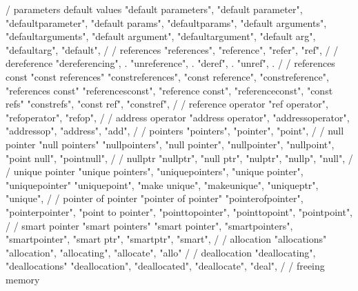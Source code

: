         / parameters default values 
        "default parameters",  
        "default parameter",  
        "defaultparameter",  
        "default params",  
        "defaultparams",  
        "default arguments",  
        "defaultarguments",  
        "default argument",  
        "defaultargument",  
        "default arg",  
        "defaultarg",  
        "default",  
        /
        / references 
        "references",  
        "reference",  
        "refer",  
        "ref",  
        /
        / dereference 
        "dereferencing", . 
        "unreference", . 
        "deref", . 
        "unref", . 
        /
        / references const 
        "const references"
        "constreferences",
        "const reference",
        "constreference", 
        "references const"
        "referencesconst",
        "reference const",
        "referenceconst", 
        "const refs"
        "constrefs",
        "const ref",
        "constref", 
        /
        / reference operator 
        "ref operator",
        "refoperator", 
        "refop",
        /
        / address operator 
        "address operator",
        "addressoperator",
        "addressop",
        "address",
        "add",
        /
        / pointers
        "pointers",
        "pointer",
        "point",
        /
        / null pointer
        "null pointers"
        "nullpointers",
        "null pointer",
        "nullpointer", 
        "nullpoint",
        "point null",
        "pointnull", 
        /
        / nullptr
        "nullptr",
        "null ptr",
        "nulptr",
        "nullp",
        "null",
        /
        / unique pointer
        "unique pointers",
        "uniquepointers", 
        "unique pointer", 
        "uniquepointer"
        "uniquepoint", 
        "make unique", 
        "makeunique",
        "uniqueptr",
        "unique",
        /
        / pointer of pointer
        "pointer of pointer"
        "pointerofpointer", 
        "pointerpointer",
        "point to pointer", 
        "pointtopointer",
        "pointtopoint",
        "pointpoint",
        /
        / smart pointer
        "smart pointers"
        "smart pointer",
        "smartpointers",
        "smartpointer", 
        "smart ptr",
        "smartptr", 
        "smart",
        /
        / allocation 
        "allocations"
        "allocation",
        "allocating",
        "allocate",
        "allo"
        /
        / deallocation 
        "deallocating",
        "deallocations"
        "deallocation",
        "deallocated", 
        "deallocate",
        "deal",
        /
        / freeing memory 
